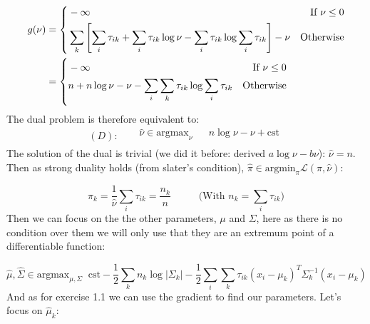 \documentclass{article}
\begin{document}
\begin{equation*}
    \begin{aligned}
        g(\nu) & = \vast\{
        \begin{aligned}
             & -\infty                                                                                                          & \text{If } \nu \le 0 \\
             & \sum_k \left[ \sum_i \tau_{ik} + \sum_i \tau_{ik} \log\nu - \sum_i \tau_{ik} \log \sum_i \tau_{ik} \right] - \nu & \text{Otherwise}     \\
        \end{aligned} \\
               & = \vast\{
        \begin{aligned}
             & -\infty                                                             & \text{If } \nu \le 0 \\
             & n + n \log\nu - \nu - \sum_i \sum_k \tau_{ik} \log \sum_i \tau_{ik} & \text{Otherwise}     \\
        \end{aligned} \\
    \end{aligned}
\end{equation*}
The dual problem is therefore equivalent to:
\begin{equation*}
    (D):\;\;\;
    \begin{aligned}
         & \widehat{\nu} \in \text{argmax}_\nu &  & n \log\nu - \nu + \text{cst} \\
    \end{aligned}
\end{equation*}
The solution of the dual is trivial (we did it before: derived $a \log\nu - b\nu$): $\widehat{\nu} = n$.\\
Then as strong duality holds (from slater's condition), $\widehat\pi \in \text{argmin}_\pi \mathcal{L}(\pi, \widehat\nu)$:

\begin{equation*}
    \boxed{\widehat{\pi}_k = \frac{1}{\widehat{\nu}} \sum_i \tau_{ik} = \frac{n_k}{n} \;\;\;\;\;\;\;\;\;\;\text{(With $n_k = \sum_i \tau_{ik}$)}}
\end{equation*}
Then we can focus on the the other parameters, $\mu$ and $\Sigma$, here as there is no condition over them we will only use that they are an
extremum point of a differentiable function:

\begin{equation*}
    \widehat\mu, \widehat\Sigma \in \text{argmax}_{\mu, \Sigma}\;\; \text{cst} - \frac{1}{2} \sum_k n_k \log|\Sigma_k| - \frac{1}{2} \sum_i \sum_k \tau_{ik} (x_i - \mu_k)^T \Sigma_k^{-1} (x_i - \mu_k)
\end{equation*}
And as for exercise 1.1 we can use the gradient to find our parameters. Let's focus on $\widehat\mu_k$:
\end{document}
